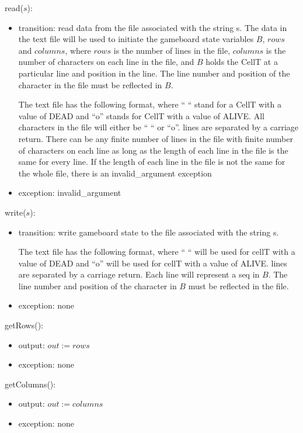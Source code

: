 \documentclass[12pt]{article}
\begin{document}
\noindent read($s$):

\begin{itemize}
\item transition: read data from the file  associated with the string s.
  The data in the text file will be used to initiate the gameboard state variables $B$, $rows$ and $columns$, where $rows$ is the number of lines in the file, $columns$ is the number of characters on each line in the file, and $B$ holds the CellT at a particular line and position in the line. The line number and position of the character in the file must be reflected in $B$. 

  The text file has the following format, where `` `` stand for a CellT with a value of DEAD  and ``o'' stands for CellT with a value of ALIVE. All characters in the file will either be `` `` or  ``o''. lines are separated by a carriage return.  There can be any finite number of lines in the file with finite number of characters on each line as long as the length of each line in the file is the same for every line.  If the length of each line in the file is not the same for the whole file, there is an invalid\_argument exception

\item exception: invalid\_argument
\end{itemize}

\noindent write($s$):

\begin{itemize}
\item transition: write gameboard state to the file  associated with the string s.

  The text file has the following format, where `` `` will be used for cellT with a value of DEAD and ``o'' will be used for cellT with a value of ALIVE. lines are separated by a carriage return. Each line will represent a seq in $B$. The line number and position of the character in $B$ must be reflected in the file.


\item exception: none
\end{itemize}


\noindent getRows():
\begin{itemize}
\item output: $out := rows$
\item exception: none
\end{itemize}

\noindent getColumns():
\begin{itemize}
\item output: $out := columns$
\item exception: none
\end{itemize}
\end{document}
